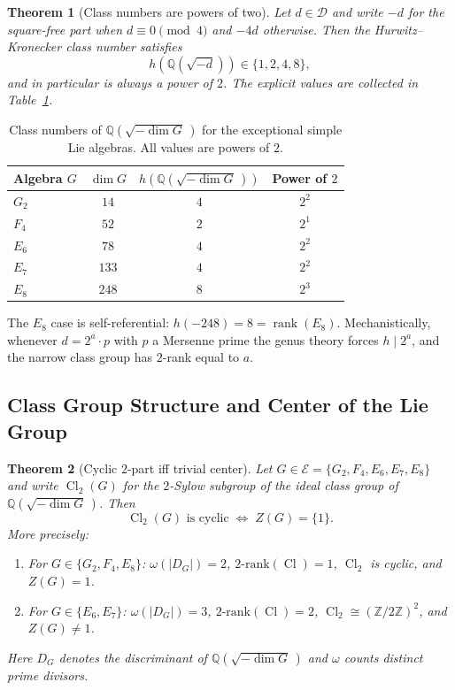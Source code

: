 \documentclass[11pt]{amsart}
\theoremstyle{plain}
\newtheorem{theorem}{Theorem}[section]
\theoremstyle{definition}
\theoremstyle{remark}
\begin{document}
\begin{theorem}[Class numbers are powers of two]\label{thm:class-pow2}
Let $d \in \mathcal{D}$ and write $-d$ for the square-free part when
$d \equiv 0 \pmod{4}$ and $-4d$ otherwise.
Then the Hurwitz--Kronecker class number satisfies
\[
  h\!\left(\mathbb{Q}\!\left(\sqrt{-d}\right)\right) \in \{1, 2, 4, 8\},
\]
and in particular is always a power of $2$.  The explicit values are
collected in Table~\ref{tab:class-numbers}.
\end{theorem}

\begin{table}[htbp]
\centering
\caption{Class numbers of $\mathbb{Q}(\!\sqrt{-\dim G}\,)$ for the exceptional
  simple Lie algebras.  All values are powers of $2$.}
\label{tab:class-numbers}
\small
\begin{tabular}{lccc}
\hline
Algebra $G$ & $\dim G$ & $h\!\left(\mathbb{Q}(\!\sqrt{-\dim G}\,)\right)$ & Power of $2$ \\
\hline
$G_2$ & $14$  & $4$ & $2^2$ \\
$F_4$ & $52$  & $2$ & $2^1$ \\
$E_6$ & $78$  & $4$ & $2^2$ \\
$E_7$ & $133$ & $4$ & $2^2$ \\
$E_8$ & $248$ & $8$ & $2^3$ \\
\hline
\end{tabular}
\end{table}

The $E_8$ case is self-referential: $h(-248) = 8 = \operatorname{rank}(E_8)$.
Mechanistically, whenever $d = 2^a \cdot p$ with $p$ a Mersenne prime
the genus theory forces $h \mid 2^a$, and the narrow class group has
$2$-rank equal to $a$.

\subsection{Class Group Structure and Center of the Lie Group}%
\label{subsec:class-group-structure}

\begin{theorem}[Cyclic $2$-part iff trivial center]%
\label{thm:cyclic-center}
Let $G \in \mathcal{E} = \{G_2, F_4, E_6, E_7, E_8\}$ and write
$\operatorname{Cl}_2(G)$ for the $2$-Sylow subgroup of the ideal class
group of $\mathbb{Q}(\!\sqrt{-\dim G}\,)$.  Then
\[
  \operatorname{Cl}_2(G) \text{ is cyclic}
  \;\Longleftrightarrow\;
  Z(G) = \{1\}.
\]
More precisely:
\begin{enumerate}
  \item For $G \in \{G_2, F_4, E_8\}$: $\omega(|D_G|) = 2$,
    $2\text{-rank}(\operatorname{Cl}) = 1$, $\operatorname{Cl}_2$ is
    cyclic, and $Z(G) = 1$.
  \item For $G \in \{E_6, E_7\}$: $\omega(|D_G|) = 3$,
    $2\text{-rank}(\operatorname{Cl}) = 2$,
    $\operatorname{Cl}_2 \cong (\mathbb{Z}/2\mathbb{Z})^2$, and
    $Z(G) \neq 1$.
\end{enumerate}
Here $D_G$ denotes the discriminant of $\mathbb{Q}(\!\sqrt{-\dim G}\,)$
and $\omega$ counts distinct prime divisors.
\end{theorem}
\end{document}
